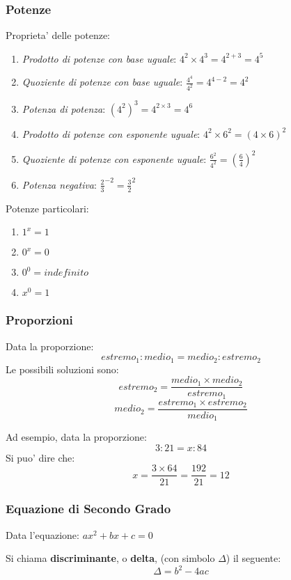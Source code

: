 \documentclass{article}
\begin{document}
{{    \subsubsection{Potenze}
    Proprieta' delle potenze:
    \begin{enumerate}
      \item \textit{Prodotto di potenze con base uguale}: $ 4^2 \times 4^3 = 4^{2 + 3} = 4^5 $
      \item \textit{Quoziente di potenze con base uguale}: $ \frac{4^4}{4^2} = 4^{4 - 2} = 4^2 $
      \item \textit{Potenza di potenza}: $ (4^2)^3 = 4^{2 \times 3} = 4^6 $
      \item \textit{Prodotto di potenze con esponente uguale}: $ 4^2 \times 6^2 = (4 \times 6)^2 $
      \item \textit{Quoziente di potenze con esponente uguale}: $ \frac{6^2}{4^2} = (\frac{6}{4})^2 $
      \item \textit{Potenza negativa}: $ \frac{2}{3}^{-2} = \frac{3}{2}^2 $
    \end{enumerate}

    Potenze particolari:
    \begin{enumerate}
      \item $ 1^x = 1 $
      \item $ 0^x = 0 $
      \item $ 0^0 = indefinito $
      \item $ x^0 = 1 $
    \end{enumerate}

    \subsubsection{Proporzioni}
    Data la proporzione:
    $$ estremo_1 : medio_1 = medio_2 : estremo_2 $$
    Le possibili soluzioni sono:
    $$ estremo_2 = \frac{medio_1 \times medio_2}{estremo_1}$$
    $$ medio_2 = \frac{estremo_1 \times estremo_2}{medio_1} $$

    Ad esempio, data la proporzione:
    $$ 3 : 21 = x : 84 $$
    Si puo' dire che:
    $$ x = \frac{3 \times 64}{21} = \frac{192}{21} = 12 $$

    \subsubsection{Equazione di Secondo Grado}
    Data l'equazione: $ax^2 + bx + c = 0 $

    Si chiama \textbf{discriminante}, o \textbf{delta}, \small{(con simbolo $ \Delta $)} il seguente:
    $$ \Delta = b^2 - 4ac $$

}}
\end{document}
